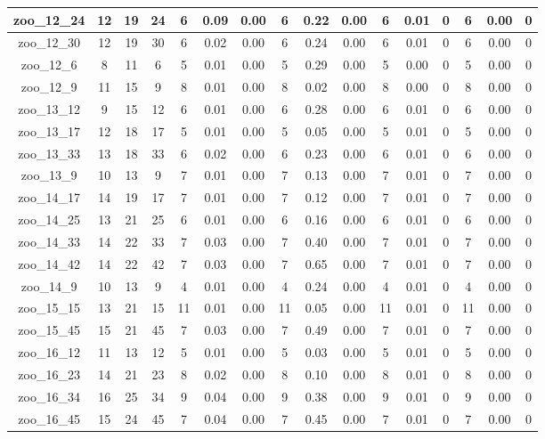 \begin{landscape}
\begin{longtable}{|c|c|c|c|c|c|c|c|c|c|c|c|c|c|c|c|}
zoo\_12\_24 & 12 & 19 & 24 & 6 & 0.09 & 0.00 & 6 & 0.22 & 0.00 & 6 & 0.01 & 0 & 6 & 0.00 & 0 \\ \hline 
zoo\_12\_30 & 12 & 19 & 30 & 6 & 0.02 & 0.00 & 6 & 0.24 & 0.00 & 6 & 0.01 & 0 & 6 & 0.00 & 0 \\ \hline 
zoo\_12\_6 & 8 & 11 & 6 & 5 & 0.01 & 0.00 & 5 & 0.29 & 0.00 & 5 & 0.00 & 0 & 5 & 0.00 & 0 \\ \hline 
zoo\_12\_9 & 11 & 15 & 9 & 8 & 0.01 & 0.00 & 8 & 0.02 & 0.00 & 8 & 0.00 & 0 & 8 & 0.00 & 0 \\ \hline 
zoo\_13\_12 & 9 & 15 & 12 & 6 & 0.01 & 0.00 & 6 & 0.28 & 0.00 & 6 & 0.01 & 0 & 6 & 0.00 & 0 \\ \hline 
zoo\_13\_17 & 12 & 18 & 17 & 5 & 0.01 & 0.00 & 5 & 0.05 & 0.00 & 5 & 0.01 & 0 & 5 & 0.00 & 0 \\ \hline 
zoo\_13\_33 & 13 & 18 & 33 & 6 & 0.02 & 0.00 & 6 & 0.23 & 0.00 & 6 & 0.01 & 0 & 6 & 0.00 & 0 \\ \hline 
zoo\_13\_9 & 10 & 13 & 9 & 7 & 0.01 & 0.00 & 7 & 0.13 & 0.00 & 7 & 0.01 & 0 & 7 & 0.00 & 0 \\ \hline 
zoo\_14\_17 & 14 & 19 & 17 & 7 & 0.01 & 0.00 & 7 & 0.12 & 0.00 & 7 & 0.01 & 0 & 7 & 0.00 & 0 \\ \hline 
zoo\_14\_25 & 13 & 21 & 25 & 6 & 0.01 & 0.00 & 6 & 0.16 & 0.00 & 6 & 0.01 & 0 & 6 & 0.00 & 0 \\ \hline 
zoo\_14\_33 & 14 & 22 & 33 & 7 & 0.03 & 0.00 & 7 & 0.40 & 0.00 & 7 & 0.01 & 0 & 7 & 0.00 & 0 \\ \hline 
zoo\_14\_42 & 14 & 22 & 42 & 7 & 0.03 & 0.00 & 7 & 0.65 & 0.00 & 7 & 0.01 & 0 & 7 & 0.00 & 0 \\ \hline 
zoo\_14\_9 & 10 & 13 & 9 & 4 & 0.01 & 0.00 & 4 & 0.24 & 0.00 & 4 & 0.01 & 0 & 4 & 0.00 & 0 \\ \hline 
zoo\_15\_15 & 13 & 21 & 15 & 11 & 0.01 & 0.00 & 11 & 0.05 & 0.00 & 11 & 0.01 & 0 & 11 & 0.00 & 0 \\ \hline 
zoo\_15\_45 & 15 & 21 & 45 & 7 & 0.03 & 0.00 & 7 & 0.49 & 0.00 & 7 & 0.01 & 0 & 7 & 0.00 & 0 \\ \hline 
zoo\_16\_12 & 11 & 13 & 12 & 5 & 0.01 & 0.00 & 5 & 0.03 & 0.00 & 5 & 0.01 & 0 & 5 & 0.00 & 0 \\ \hline 
zoo\_16\_23 & 14 & 21 & 23 & 8 & 0.02 & 0.00 & 8 & 0.10 & 0.00 & 8 & 0.01 & 0 & 8 & 0.00 & 0 \\ \hline 
zoo\_16\_34 & 16 & 25 & 34 & 9 & 0.04 & 0.00 & 9 & 0.38 & 0.00 & 9 & 0.01 & 0 & 9 & 0.00 & 0 \\ \hline 
zoo\_16\_45 & 15 & 24 & 45 & 7 & 0.04 & 0.00 & 7 & 0.45 & 0.00 & 7 & 0.01 & 0 & 7 & 0.00 & 0 \\ \hline 

\end{longtable}
\end{landscape}
